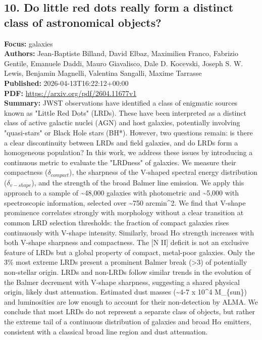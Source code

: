 \documentclass[11pt]{article}
\begin{document}
\subsection*{10. Do little red dots really form a distinct class of astronomical objects?}
\textbf{Focus:} galaxies\\
\textbf{Authors:} Jean-Baptiste Billand, David Elbaz, Maximilien Franco, Fabrizio Gentile, Emanuele Daddi, Mauro Giavalisco, Dale D. Kocevski, Joseph S. W. Lewis, Benjamin Magnelli, Valentina Sangalli, Maxime Tarrasse\\
\textbf{Published:} 2026-04-13T16:22:12+00:00\\
\textbf{PDF:} \href{https://arxiv.org/pdf/2604.11677v1}{https://arxiv.org/pdf/2604.11677v1}\\
\textbf{Summary:}
JWST observations have identified a class of enigmatic sources known as "Little Red Dots" (LRDs). These have been interpreted as a distinct class of active galactic nuclei (AGN) and host galaxies, potentially involving "quasi-stars" or Black Hole stars (BH*). However, two questions remain: is there a clear discontinuity between LRDs and field galaxies, and do LRDs form a homogeneous population? In this work, we address these issues by introducing a continuous metric to evaluate the "LRDness" of galaxies. We measure their compactness ($\delta _{compact}$), the sharpness of the V-shaped spectral energy distribution ($\delta _{v-shape}$), and the strength of the broad Balmer line emission. We apply this approach to a sample of \textasciitilde{}48,000 galaxies with photometric and \textasciitilde{}5,000 with spectroscopic information, selected over \textasciitilde{}750 arcmin\textasciicircum{}2. We find that V-shape prominence correlates strongly with morphology without a clear transition at common LRD selection thresholds: the fraction of compact galaxies rises continuously with V-shape intensity. Similarly, broad H$\alpha $ strength increases with both V-shape sharpness and compactness. The [N II] deficit is not an exclusive feature of LRDs but a global property of compact, metal-poor galaxies. Only the 3\% most extreme LRDs present a prominent Balmer break (>3) of potentially non-stellar origin. LRDs and non-LRDs follow similar trends in the evolution of the Balmer decrement with V-shape sharpness, suggesting a shared physical origin, likely dust attenuation. Estimated dust masses (\textasciitilde{}4-7 x 10\textasciicircum{}4 M\_\{sun\}) and luminosities are low enough to account for their non-detection by ALMA. We conclude that most LRDs do not represent a separate class of objects, but rather the extreme tail of a continuous distribution of galaxies and broad H$\alpha $ emitters, consistent with a classical broad line region and dust attenuation.
\end{document}
